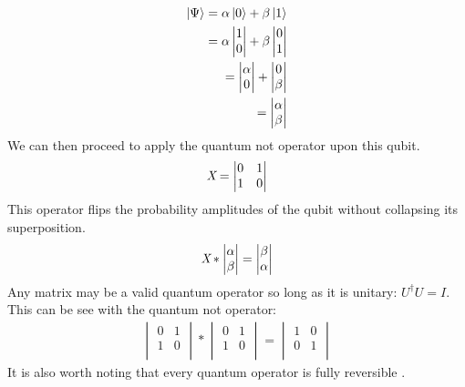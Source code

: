 \documentclass[conference]{IEEEtran}
\begin{document}
\begin{align*}
\ket{\Psi} = \alpha\ket{0} + \beta\ket{1} \\
 = \alpha \begin{vmatrix}
1\\
0\\
\end{vmatrix} + \beta \begin{vmatrix}
0\\
1\\
\end{vmatrix} \\
=  \begin{vmatrix}
\alpha\\
0\\
\end{vmatrix} +  \begin{vmatrix}
0\\
\beta\\
\end{vmatrix} \\
 =  \begin{vmatrix}
\alpha\\
\beta\\
\end{vmatrix} 
\end{align*}
We can then proceed to apply the quantum not operator upon this qubit. 
\begin{align*}
    \emph{X} = \begin{vmatrix}
    0 & 1 \\
    1 & 0 \\
    \end{vmatrix}
\end{align*}
This operator flips the probability amplitudes of the qubit without collapsing its superposition.
\begin{align*}
    \emph{X} * \begin{vmatrix}
\alpha\\
\beta\\
\end{vmatrix} = \begin{vmatrix}
\beta\\
\alpha\\
\end{vmatrix} 
\end{align*}
Any matrix may be a valid quantum operator so long as it is unitary: $U^\dagger U = I$. This can be see with the quantum not operator: 
\begin{align*}
    \begin{vmatrix}
    0 & 1 \\
    1 & 0 \\
    \end{vmatrix} * \begin{vmatrix}
    0 & 1 \\
    1 & 0 \\
    \end{vmatrix} =
    \begin{vmatrix}
    1 & 0 \\
    0 & 1 \\
    \end{vmatrix}
\end{align*}
It is also worth noting that every quantum operator is fully reversible \cite{b9}.
\end{document}
